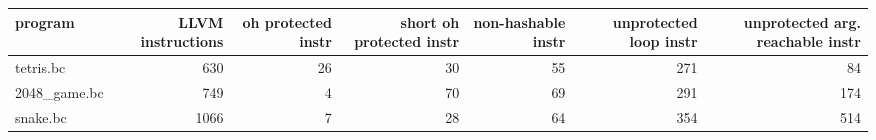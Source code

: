 \documentclass{article}
\begin{document}
\begin{table}[ht]
\centering
\begin{adjustbox}{width=1.3\textwidth}

\begin{tabular}{lrrrrrr}
\hline
 program      &   LLVM instructions &   oh protected instr &   short oh protected instr &   non-hashable instr &   unprotected loop instr &   unprotected arg. reachable instr \\
\hline
 tetris.bc    &                 630 &                   26 &                         30 &                   55 &                      271 &                                 84 \\
 2048\_game.bc &                 749 &                    4 &                         70 &                   69 &                      291 &                                174 \\
 snake.bc     &                1066 &                    7 &                         28 &                   64 &                      354 &                                514 \\
\hline
\end{tabular}

\end{adjustbox}
\end{table}
\end{document}
